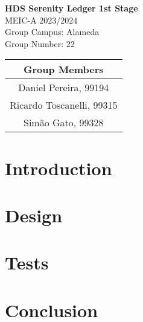 \documentclass[12pt]{article}
\begin{document}
\begin{titlepage}
    \vspace*{\fill}
    \centering
    \LARGE\textbf{HDS Serenity Ledger 1st Stage}\\
    \vspace{2em}
    \LARGE
    MEIC-A 2023/2024\\
    Group Campus: Alameda\\
    Group Number: 22\\
    \vspace{2em}
    \begin{tabular}{|c|}
        \hline
        Group Members\\
        \hline
        Daniel Pereira, 99194\\
        Ricardo Toscanelli, 99315\\
        Simão Gato, 99328\\
        \hline
    \end{tabular}
    \vspace{2em}
    \vspace*{\fill}
\end{titlepage}

\tableofcontents
\newpage

\section{Introduction}

\section{Design}

\section{Tests}

\section{Conclusion}

\label{LastPage}
\end{document}

